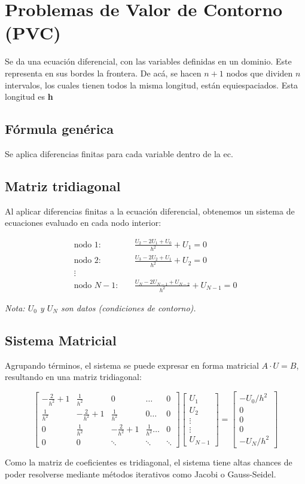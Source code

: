 \section{Problemas de Valor de Contorno (PVC)}
Se da una ecuación diferencial, con las variables definidas en un dominio. Este representa
en sus bordes la frontera. De acá, se hacen $n+1$ nodos que dividen $n$ intervalos, los cuales
tienen todos la misma longitud, están equiespaciados. Esta longitud es \textbf{h}
\subsection{Fórmula genérica}
Se aplica diferencias finitas para cada variable dentro de la ec.
\subsection{Matriz tridiagonal}
Al aplicar diferencias finitas a la ecuación diferencial, obtenemos un sistema de ecuaciones evaluado en cada nodo interior:

\begin{align*}
    \text{nodo 1:} \quad & \frac{U_2 - 2U_1 + U_0}{h^2} + U_1 = 0 \\
    \text{nodo 2:} \quad & \frac{U_3 - 2U_2 + U_1}{h^2} + U_2 = 0 \\
    \vdots \quad & \\
    \text{nodo } N-1: \quad & \frac{U_N - 2U_{N-1} + U_{N-2}}{h^2} + U_{N-1} = 0
\end{align*}

\textit{Nota: $U_0$ y $U_N$ son datos (condiciones de contorno).}

\subsection{Sistema Matricial}
Agrupando términos, el sistema se puede expresar en forma matricial $A \cdot U = B$, resultando en una matriz tridiagonal:

\begin{equation}
\begin{bmatrix}
    -\frac{2}{h^2} + 1 & \frac{1}{h^2} & 0 & \dots & 0 \\[1em]
    \frac{1}{h^2} & -\frac{2}{h^2} + 1 & \frac{1}{h^2} & 0 \dots & 0 \\[1em]
    0 & \frac{1}{h^2} & -\frac{2}{h^2} + 1 & \frac{1}{h^2} \dots & 0 \\[1em]
    0 & 0 & \ddots & \ddots & \ddots
\end{bmatrix}
\begin{bmatrix}
    U_1 \\
    U_2 \\
    \vdots \\
    \vdots \\
    U_{N-1}
\end{bmatrix}
=
\begin{bmatrix}
    -U_0 / h^2 \\
    0 \\
    0 \\
    0 \\
    -U_N / h^2
\end{bmatrix}
\end{equation}

Como la matriz de coeficientes es tridiagonal, el sistema tiene altas chances de poder resolverse mediante métodos iterativos como Jacobi o Gauss-Seidel.